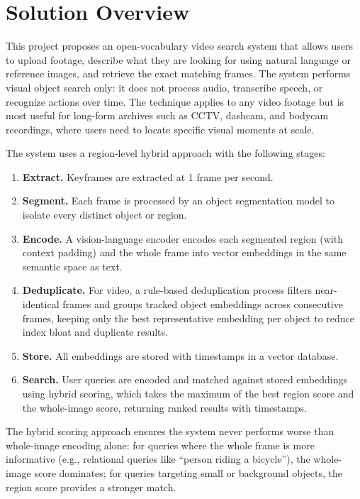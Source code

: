 \section{Solution Overview}
\label{section:solution-overview}

This project proposes an open-vocabulary video search system that allows users to upload footage, describe what they are looking for using natural language or reference images, and retrieve the exact matching frames. The system performs visual object search only: it does not process audio, transcribe speech, or recognize actions over time. The technique applies to any video footage but is most useful for long-form archives such as CCTV, dashcam, and bodycam recordings, where users need to locate specific visual moments at scale.

The system uses a region-level hybrid approach with the following stages:

\begin{enumerate}
    \item \textbf{Extract.} Keyframes are extracted at 1 frame per second.
    \item \textbf{Segment.} Each frame is processed by an object segmentation model to isolate every distinct object or region.
    \item \textbf{Encode.} A vision-language encoder encodes each segmented region (with context padding) and the whole frame into vector embeddings in the same semantic space as text.
    \item \textbf{Deduplicate.} For video, a rule-based deduplication process filters near-identical frames and groups tracked object embeddings across consecutive frames, keeping only the best representative embedding per object to reduce index bloat and duplicate results.
    \item \textbf{Store.} All embeddings are stored with timestamps in a vector database.
    \item \textbf{Search.} User queries are encoded and matched against stored embeddings using hybrid scoring, which takes the maximum of the best region score and the whole-image score, returning ranked results with timestamps.
\end{enumerate}

The hybrid scoring approach ensures the system never performs worse than whole-image encoding alone: for queries where the whole frame is more informative (e.g., relational queries like ``person riding a bicycle''), the whole-image score dominates; for queries targeting small or background objects, the region score provides a stronger match.

